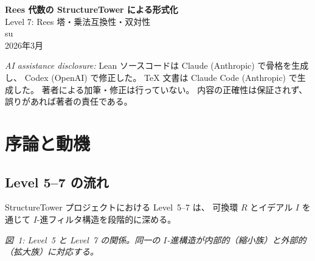 \documentclass[a4paper,12pt]{article}
\theoremstyle{definition}
\theoremstyle{plain}
\newcommand{\figcap}[1]{\begin{center}\small\textit{#1}\end{center}}
\newcommand{\reesdeg}{\mathrm{reesDegreeTower}}
\newcommand{\idealpow}{\mathrm{idealPowTower}}
\newcommand{\STower}{\mathrm{StructureTower}}
\begin{document}
\begin{center}
  {\LARGE\bfseries Rees 代数の StructureTower による形式化}\\[6pt]
  {\Large Level 7: Rees 塔・乗法互換性・双対性}\\[12pt]
  {\large su}\\[4pt]
  {\normalsize 2026年3月}
\end{center}

\bigskip
\begin{center}
\small
\textit{AI assistance disclosure:}
Lean ソースコードは Claude (Anthropic) で骨格を生成し、
Codex (OpenAI) で修正した。
\TeX{} 文書は Claude Code (Anthropic) で生成した。
著者による加筆・修正は行っていない。
内容の正確性は保証されず、誤りがあれば著者の責任である。
\end{center}

\bigskip
\begin{abstract}
可換環 $R$ とイデアル $I \trianglelefteq R$ に対する
Rees 代数 $R[It] = \bigoplus_{n \geq 0} I^n t^n$ を、
StructureTower フレームワークの言語で形式化する試みを解説する。
Level~5 で構成した $I$-進フィルタ
（$\idealpow\,I : \STower\,\mathbb{N}^{\mathrm{op}}\,R$、縮小族）に対し、
Level~7 では同じ $I$-進構造の「外部的」表示として
$\reesdeg\,I : \STower\,\mathbb{N}\,(R[X])$（拡大族）を構成する。
両者の双対性を係数抽出写像と単項式埋め込みで明示し、
Mathlib の \texttt{reesAlgebra} との一致を形式的に確認する。
さらに、各レベルが ClosedTower の性質を持たないことを具体的な反例で示し、
FilteredRing の乗法互換性との構造的区別を論じる。
\end{abstract}

\tableofcontents
\newpage

\section{序論と動機}

\subsection{Level 5--7 の流れ}

StructureTower プロジェクトにおける Level~5--7 は、
可換環 $R$ とイデアル $I$ を通じて $I$-進フィルタ構造を段階的に深める。

\begin{center}
\end{center}
\figcap{図~1: Level~5 と Level~7 の関係。同一の $I$-進構造が内部的（縮小族）と外部的（拡大族）に対応する。}
\end{document}
